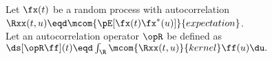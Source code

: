 \begin{example}
Let $\fx(t)$ be a random process with autocorrelation
\\\indentx$\Rxx(t,u) \eqd \mcom{\pE[ \fx(t)\fx^\ast(u) ]}{expectation}$.
\\Let an autocorrelation operator $\opR$ be defined as
  $\ds
    [\opR \ff](t) \eqd \int_\R \mcom{\Rxx(t,u)}{kernel} \ff(u) \du.
  $
\end{example}

